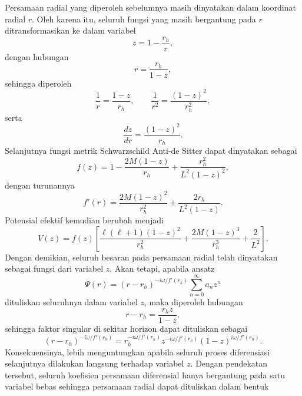 Persamaan radial yang diperoleh sebelumnya masih dinyatakan dalam koordinat radial $r$. Oleh karena itu, seluruh fungsi yang masih bergantung pada $r$ ditransformasikan ke dalam variabel
\begin{equation} z = 1-\frac{r_h}{r}, \end{equation}
dengan hubungan
\begin{equation} r = \frac{r_h}{1-z}, \end{equation}
sehingga diperoleh
\begin{equation} \frac{1}{r} = \frac{1-z}{r_h}, \qquad \frac{1}{r^2} = \frac{(1-z)^2}{r_h^2}, \end{equation}
serta
\begin{equation} \frac{dz}{dr} = \frac{(1-z)^2}{r_h}. \end{equation}
Selanjutnya fungsi metrik Schwarzschild Anti-de Sitter dapat dinyatakan sebagai
\begin{equation} f(z) = 1 - \frac{2M(1-z)}{r_h} + \frac{r_h^2}{L^2(1-z)^2}, \end{equation}
dengan turunannya
\begin{equation} f'(r) = \frac{2M(1-z)^2}{r_h^2} + \frac{2r_h}{L^2(1-z)}. \end{equation}
Potensial efektif kemudian berubah menjadi
\begin{equation} V(z) = f(z) \left[ \frac{\ell(\ell+1)(1-z)^2}{r_h^2} + \frac{2M(1-z)^3}{r_h^3} + \frac{2}{L^2} \right]. \end{equation}
Dengan demikian, seluruh besaran pada persamaan radial telah dinyatakan sebagai fungsi dari variabel $z$. Akan tetapi, apabila ansatz
\begin{equation} \Psi(r) = (r-r_h)^{-i\omega/f'(r_h)} \sum_{n=0}^{\infty} a_nz^n \end{equation}
dituliskan seluruhnya dalam variabel $z$, maka diperoleh hubungan
\begin{equation} r-r_h = \frac{r_hz}{1-z}, \end{equation}
sehingga faktor singular di sekitar horizon dapat dituliskan sebagai
\begin{equation} (r-r_h)^{-i\omega/f'(r_h)} = r_h^{-i\omega/f'(r_h)} z^{-i\omega/f'(r_h)} (1-z)^{i\omega/f'(r_h)}. \end{equation}
Konsekuensinya, lebih menguntungkan apabila seluruh proses diferensiasi selanjutnya dilakukan langsung terhadap variabel $z$. Dengan pendekatan tersebut, seluruh koefisien persamaan diferensial hanya bergantung pada satu variabel bebas sehingga persamaan radial dapat dituliskan dalam bentuk
